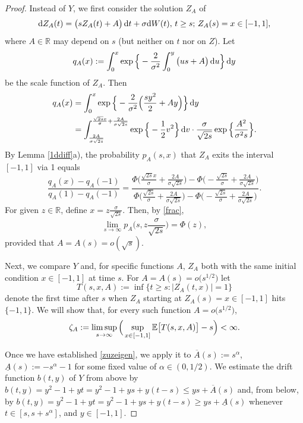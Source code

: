 \documentclass[sn-mathphys-num]{sn-jnl}
\theoremstyle{definition}
\newcommand{\scr}[1]{\mathscr #1}
\numberwithin{equation}{section} \theoremstyle{remark}
\renewcommand{\d}{\hbox{d}}
\def\R{\mathbb R}
\def\d{\text{\rm{d}}} \def\bb{\beta} \def\aa{\alpha} \def\D{\scr D}
\newcommand{\1}{\mathbbm{1}}
\renewcommand{\bar}{\overline}
\begin{document}
\begin{proof}
  Instead of $Y$, we first consider the solution $Z_A$ of
 \begin{equation}\label{ZZZ}
\d Z_A(t)=\big(sZ_A(t)+A\big)\,\d t +\sigma \d W(t),\,t \geq s;\, Z_A(s)=x \in [-1,1],
\end{equation}
where $A \in \R$ may depend on $s$ (but neither on $t$ nor on $Z$).
Let
$$
q_A(x):=\int_0^x\exp \Big\{-\frac 2{\sigma^2} \int_0^y\big(us+A\big)\,\d u   \Big\}\,\d y
$$
be the scale function of $Z_A$. Then
\begin{align*}
q_A(x)&=\int_0^x \exp \Big\{-\frac 2{\sigma^2} \Big(\frac{sy^2} 2+Ay\Big)   \Big\}\,\d y\\
&=\int_{\frac{2A}{\sigma \sqrt{2s}}}^{\frac {\sqrt{2s}x}\sigma + \frac{2A}{\sigma\sqrt{2s}}} \exp\Big\{-\frac 12 v^2\Big\}\,\d v \cdot \frac \sigma{\sqrt{2s}}  \exp\Big\{\frac {A^2}{\sigma^2 s}\Big\}.
\end{align*}
By Lemma \ref{1ddiff}a), the probability $p_A(s,x)$ that $Z_A$ exits the interval $[-1,1]$ via 1 equals
\begin{equation}\label{frac}
\frac{q_A(x)-q_A(-1)}{q_A(1)-q_A(-1)}=\frac{\Phi\Big( \frac {\sqrt{2s}x}\sigma +\frac{2A}{\sigma \sqrt{2s}}\Big) - \Phi\Big( -\frac {\sqrt{2s}}\sigma +\frac{2A}{\sigma \sqrt{2s}}\Big)}
{\Phi\Big( \frac {\sqrt{2s}}\sigma +\frac{2A}{\sigma \sqrt{2s}}\Big) - \Phi\Big( -\frac {\sqrt{2s}}\sigma +\frac{2A}{\sigma \sqrt{2s}}\Big)}.
\end{equation}
For given $z \in \R$, define $x=z\frac \sigma{\sqrt{2s}}$. Then, by \eqref{frac},
\begin{equation}\label{assame}
\lim_{s \to \infty} p_A\Big(s, z\frac \sigma{\sqrt{2s}}\Big)=\Phi(z),
\end{equation}
provided that $A=A(s)=o(\sqrt{s})$.

Next, we compare  $Y$ and, for specific functions $A$, $Z_A$  both with the same initial condition $x\in [-1,1]$ at time $s$.
For $A=A(s)=o\big(s^{1/2}\big)$ let
$$
T(s,x,A):=\inf\{t \geq s: |Z_A(t,x)|=1\}
$$ denote the first time after $s$ when  $Z_A$ starting at $Z_A(s)=x\in[-1,1]$ hits $\{-1,1\}$. We will show that, for every such function $A=o\big(s^{1/2}\big)$,
\begin{equation}\label{zuzeigen}
  \zeta_A:=\limsup_{s \to \infty}\Big(\sup_{x \in [-1,1]}\mathbb E \big[T(s,x,A)\big]-s\Big)<\infty.
\end{equation}

Once we have established \eqref{zuzeigen}, we apply it to 
$\bar A(s):=s^\alpha$, $\underline A(s):=-s^\alpha-1 $ for some fixed value of $\alpha \in (0,1/2)$.  We estimate the drift function $b(t,y)$ of $Y$ from above
by $b(t,y)=y^2-1+yt= y^2-1+ys+y(t-s) \leq ys + \bar A(s)$ %
and, from below, by $b(t,y)=y^2-1+yt= y^2-1+ys+y(t-s) \geq ys + \underline A(s)$ whenever $t \in [s,s+s^\alpha]$, and $y \in [-1,1]$.


\end{proof}
\end{document}
